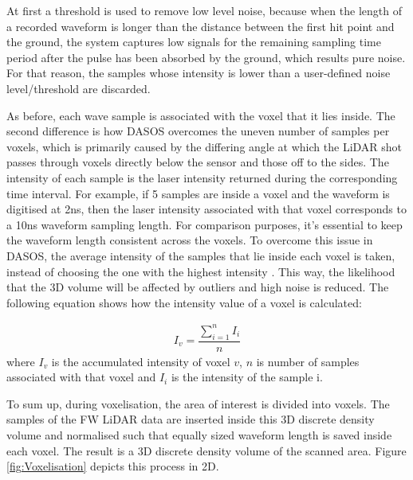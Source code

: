 \documentclass{subfiles}
\begin{document}
	\par At first a threshold is used to remove low level noise, because when the length of a recorded waveform is longer than the distance between the first hit point and the ground, the system captures low signals for the remaining sampling time period after the pulse has been absorbed by the ground, which results pure noise. For that reason, the samples whose intensity is lower than a user-defined noise level/threshold are discarded. 
		

		\par As before, each wave sample is associated with the voxel that it lies inside.  The second difference is how DASOS overcomes the uneven number of samples per voxels, which is primarily caused by the differing angle at which the LiDAR shot passes through voxels directly below the sensor and those off to the sides. The intensity of each sample is the laser intensity returned during the corresponding time interval. For example, if 5 samples are inside a voxel and the waveform is digitised at 2ns, then the laser intensity associated with that voxel corresponds to a 10ns waveform sampling length. For comparison purposes, it's essential to keep the waveform length consistent across the voxels. To overcome this issue in DASOS, the average intensity of the samples that lie inside each voxel is taken, instead of choosing the one with the highest intensity \cite{Persson2005}. This way, the likelihood that the 3D volume will be affected by outliers and high noise is reduced. The following equation shows how the intensity value of a voxel is calculated:
		
		\begin{eqnarray}
		I_{v} = \dfrac{\sum_{i=1}^{n}I_{i}}{n}
		\end{eqnarray} 
		where 		$I_{v}$ is the accumulated intensity of voxel $v$,
		$n$ is number of samples associated with that voxel and
		$I_{i}$ is the intensity of the sample i.
		
		To sum up, during voxelisation, the area of interest is divided into voxels. The samples of the FW LiDAR data are inserted inside this 3D discrete density volume and normalised such that equally sized waveform length is saved inside each voxel. The result is a 3D discrete density volume of the scanned area. Figure \ref{fig:Voxelisation} depicts this process in 2D.
		
\end{document}
